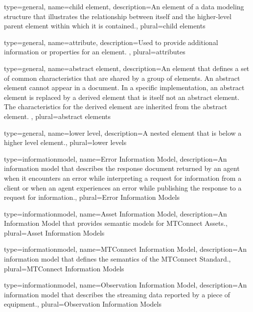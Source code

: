 {
	type={general},
    name={child element},
	description={An \gls{element} of a data modeling structure that illustrates the relationship between itself and the higher-level \gls{parent element} within which it is contained.},
	plural={child elements}
}

{
	type={general},
    name={attribute},
	description={Used to provide additional information or properties for an \gls{element}.
},
	plural={attributes}
}

{
	type={general},
    name={abstract element},
	description={An element that defines a set of common characteristics that are shared by a group of elements.
An abstract element cannot appear in a document. In a specific implementation, an abstract element is replaced by a derived element that is itself not an abstract element. The characteristics for the derived element are inherited from the abstract element. 
},
	plural={abstract elements}
}

{
	type={general},
    name={lower level},
	description={A nested element that is below a higher level element.},
	plural={lower levels}
}

{
	type={informationmodel},
    name={Error Information Model},
	description={An \gls{information model} that describes the \gls{response document} returned by an \gls{agent} when it encounters an error while interpreting a \gls{request} for information from a \gls{client} or when an \gls{agent} experiences an error while publishing the \gls{response} to a \gls{request} for information.},
	plural={Error Information Models}
}

{
	type={informationmodel},
    name={Asset Information Model},
	description={An {{Information Model}} that provides semantic models for \glspl{MTConnect Asset}.},
	plural={Asset Information Models}
}

{
	type={informationmodel},
    name={MTConnect Information Model},
	description={An \gls{information model} that defines the semantics of the MTConnect Standard.},
	plural={MTConnect Information Models}
}

{
	type={informationmodel},
    name={Observation Information Model},
	description={An \gls{information model} that describes the \gls{streaming data} reported by a piece of equipment.},
	plural={Observation Information Models}
}

